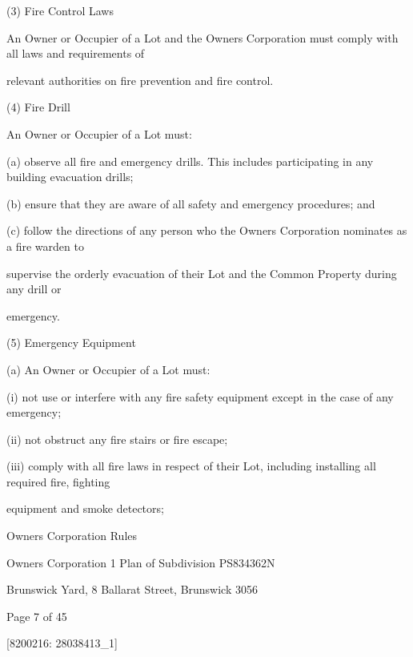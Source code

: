 \documentclass{article}
\begin{document}
{\fontsize{9.962}{1}(3) Fire Control Laws }

{\fontsize{10.02}{1}An Owner or Occupier of a Lot and the Owners Corporation must comply with all laws and requirements of }

{\fontsize{10.02}{1}relevant authorities on fire prevention and fire control. }

{\fontsize{9.962}{1}(4) Fire Drill }

{\fontsize{10.02}{1}An Owner or Occupier of a Lot must: }

{\fontsize{9.962}{1}(a) observe all fire and emergency drills. This includes participating in any building evacuation drills; }

{\fontsize{9.962}{1}(b) ensure that they are aware of all safety and emergency procedures; and }

{\fontsize{9.962}{1}(c) follow the directions of any person who the Owners Corporation nominates as a fire warden to }

{\fontsize{10.02}{1}supervise the orderly evacuation of their Lot and the Common Property during any drill or }

{\fontsize{10.02}{1}emergency. }

{\fontsize{9.962}{1}(5) Emergency Equipment }

{\fontsize{9.962}{1}(a) An Owner or Occupier of a Lot must: }

{\fontsize{9.962}{1}(i) not use or interfere with any fire safety equipment except in the case of any emergency; }

{\fontsize{9.962}{1}(ii) not obstruct any fire stairs or fire escape; }

{\fontsize{9.962}{1}(iii) comply with all fire laws in respect of their Lot, including installing all required fire, fighting }

{\fontsize{10.02}{1}equipment and smoke detectors; }

\newpage





{\fontsize{9}{1}Owners Corporation Rules }

{\fontsize{9}{1}Owners Corporation 1 Plan of Subdivision PS834362N }

{\fontsize{9}{1}Brunswick Yard, 8 Ballarat Street, Brunswick 3056 }


{\fontsize{9}{1}Page 7  of 45 }



{\fontsize{7.02}{1}[8200216: 28038413\_1] }
\end{document}
